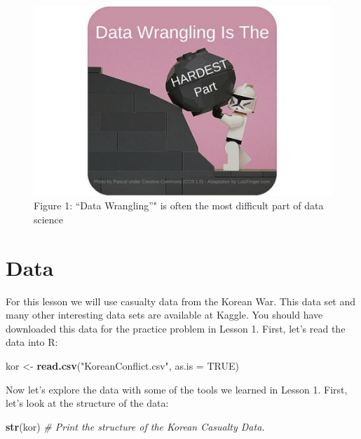 \documentclass[]{book}
\newenvironment{Shaded}{\begin{snugshade}}{\end{snugshade}}
\newcommand{\KeywordTok}[1]{\textcolor[rgb]{0.13,0.29,0.53}{\textbf{{#1}}}}
\newcommand{\DataTypeTok}[1]{\textcolor[rgb]{0.13,0.29,0.53}{{#1}}}
\newcommand{\StringTok}[1]{\textcolor[rgb]{0.31,0.60,0.02}{{#1}}}
\newcommand{\CommentTok}[1]{\textcolor[rgb]{0.56,0.35,0.01}{\textit{{#1}}}}
\newcommand{\OtherTok}[1]{\textcolor[rgb]{0.56,0.35,0.01}{{#1}}}
\newcommand{\NormalTok}[1]{{#1}}
\begin{document}
\begin{figure}[htbp]
\centering
\includegraphics{dataWrangling.jpg}
\caption{Figure 1: ``Data Wrangling''" is often the most difficult part
of data science}
\end{figure}

\section{Data}\label{data}

For this lesson we will use casualty data from the Korean War. This data
set and many other interesting data sets are available at Kaggle. You
should have downloaded this data for the practice problem in Lesson 1.
First, let's read the data into R:

\begin{Shaded}
\begin{Highlighting}[]
\NormalTok{kor <-}\StringTok{ }\KeywordTok{read.csv}\NormalTok{(}\StringTok{"KoreanConflict.csv"}\NormalTok{, }\DataTypeTok{as.is =} \OtherTok{TRUE}\NormalTok{)}
\end{Highlighting}
\end{Shaded}

Now let's explore the data with some of the tools we learned in Lesson
1. First, let's look at the structure of the data:

\begin{Shaded}
\begin{Highlighting}[]
\KeywordTok{str}\NormalTok{(kor)  }\CommentTok{# Print the structure of the Korean Casualty Data.}
\end{Highlighting}
\end{Shaded}
\end{document}
